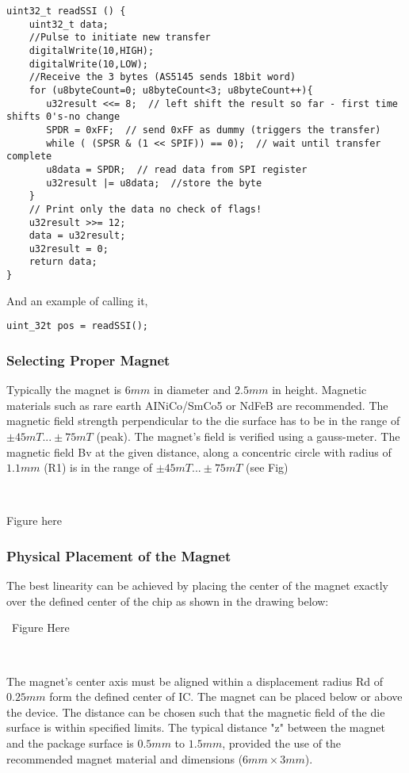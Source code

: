 \begin{lstlisting}[style=My_Arduino, caption=Function readSSI() to read the position]
uint32_t readSSI () {
    uint32_t data;
    //Pulse to initiate new transfer
    digitalWrite(10,HIGH);
    digitalWrite(10,LOW);
    //Receive the 3 bytes (AS5145 sends 18bit word)
    for (u8byteCount=0; u8byteCount<3; u8byteCount++){
       u32result <<= 8;  // left shift the result so far - first time shifts 0's-no change
       SPDR = 0xFF;  // send 0xFF as dummy (triggers the transfer)
       while ( (SPSR & (1 << SPIF)) == 0);  // wait until transfer complete
       u8data = SPDR;  // read data from SPI register
       u32result |= u8data;  //store the byte
    }
    // Print only the data no check of flags!
    u32result >>= 12;
    data = u32result;
    u32result = 0;
    return data;
}
\end{lstlisting}


\noindent And an example of calling it,

\lstset { frame = None}

\begin{lstlisting}
uint_32t pos = readSSI();
\end{lstlisting}

\subsubsection{Selecting Proper Magnet}

Typically the magnet is $6mm$ in diameter and $2.5mm$ in height. Magnetic materials such as rare earth AINiCo/SmCo5 or NdFeB are recommended. The magnetic field strength perpendicular to the die surface has to be in the range of $\pm45mT...\pm75mT$ (peak). The magnet's field is verified using a gauss-meter. The magnetic field Bv at the given distance, along a concentric circle with radius of $1.1mm$ (R1) is in the range of $\pm45mT...\pm75mT$ (see Fig)

\

Figure here


\subsubsection{Physical Placement of the Magnet}

The best linearity can be achieved by placing the center of the magnet exactly over the defined center of the chip as shown in the drawing below:

\
Figure Here 

\

The magnet's center axis must be aligned within a displacement radius Rd of $0.25mm$ form the defined center of IC. The magnet can be placed below or above the device. The distance can be chosen such that the magnetic field of the die surface is within specified limits. The typical distance "z" between the magnet and the package surface is $0.5mm$ to $1.5mm$, provided the use of the recommended magnet material and dimensions ($6mm \times 3mm$).
